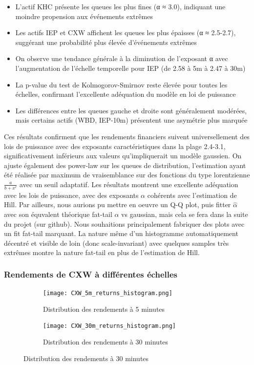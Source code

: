 \documentclass[10pt,a4paper]{article}
\theoremstyle{definition}
\theoremstyle{remark}
\begin{document}
\begin{itemize}
\begin{itemize}
    \item L'actif KHC présente les queues les plus fines (α ≈ 3.0), indiquant une moindre propension aux événements extrêmes
    \item Les actifs IEP et CXW affichent les queues les plus épaisses (α ≈ 2.5-2.7), suggérant une probabilité plus élevée d'événements extrêmes
    \item On observe une tendance générale à la diminution de l'exposant α avec l'augmentation de l'échelle temporelle pour IEP (de 2.58 à 5m à 2.47 à 30m)
    \item La p-value du test de Kolmogorov-Smirnov reste élevée pour toutes les échelles, confirmant l'excellente adéquation du modèle en loi de puissance
    \item Les différences entre les queues gauche et droite sont généralement modérées, mais certains actifs (WBD, IEP-10m) présentent une asymétrie plus marquée
\end{itemize}
Ces résultats confirment que les rendements financiers suivent universellement des lois de puissance avec des exposants caractéristiques dans la plage 2.4-3.1, significativement inférieurs aux valeurs qu'impliquerait un modèle gaussien. On ajuste également des power-law sur les queues de distribution, l'estimation ayant été réalisée par maximum de vraisemblance sur des fonctions du type lorentzienne $\frac{a}{b+x^c}$ avec un seuil adaptatif. Les résultats montrent une excellente adéquation avec les lois de puissance, avec des exposants $\alpha$ cohérents avec l'estimation de Hill. Par ailleurs, nous aurions pu mettre en oeuvre un Q-Q plot, puis fitter $\hat \alpha$ avec son équvalent théorique fat-tail $\alpha$ vs gaussian, mais cela se fera dans la suite du projet (sur github). Nous souhaitions principalement fabriquer des plots avec un fit fat-tail marquant. La nature même d'un histogramme automatiquement décentré et visible de loin (donc scale-invariant) avec quelques samples très extrêmes montre la nature fat-tail en plus de l'estimation de Hill.

\subsubsection{Rendements de CXW à différentes échelles}

\begin{figure}[H]
    \centering
    \begin{subfigure}[b]{0.45\textwidth}
        \texttt{[image: CXW\_5m\_returns\_histogram.png]}
        \caption{Distribution des rendements à 5 minutes}
        \label{fig:CXW_5m_moved}
    \end{subfigure}
    \hfill
    \hfill
    \begin{subfigure}[b]{0.45\textwidth}
        \texttt{[image: CXW\_30m\_returns\_histogram.png]}
        \caption{Distribution des rendements à 30 minutes}
        \label{fig:CXW_30m_moved}
    \end{subfigure}
    

\end{figure}
\end{itemize}
\end{document}
